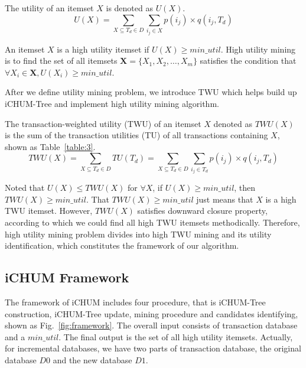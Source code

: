 \documentclass[runningheads,a4paper]{llncs}
\begin{document}
\begin{definition} %
The utility of an itemset $ X $ is denoted as $ U(X) $. 
\begin{equation}
U(X) = \sum_{X \subseteq T_{d} \in D} \sum_{i_{j} \in X} p(i_{j}) \times q(i_{j},T_{d})
\end{equation}
\end{definition}
\begin{definition} %
An itemset $ X $ is a high utility itemset if $ U(X) \ge min\_util $. High utility mining is to find the set of all itemsets $ \mathbf{X} = \{X_{1},X_{2},\ldots,X_{m}\} $ satisfies the condition that $ \forall X_{i} \in \mathbf{X}, U(X_{i}) \ge min\_util $. 
\end{definition}

After we define utility mining problem, we introduce TWU \cite{Liu:two-phasewithCCPD} which helps build up iCHUM-Tree and implement high utility mining algorithm.

\begin{definition} 
The transaction-weighted utility (TWU) of an itemset $ X $ denoted as $ TWU(X) $ is the sum of the transaction utilities (TU) of all transactions containing $ X $, shown as Table~\ref{table:3}.  
\begin{equation}
TWU(X) = \sum_{X \subseteq T_{d} \in D}TU(T_{d}) = \sum_{X \subseteq T_{d} \in D} \sum_{i_{j} \in T_{d}} p(i_{j}) \times q(i_{j},T_{d})
\end{equation}
\end{definition}

Noted that $ U(X) \le TWU(X) $ for $ \forall X $, if $ U(X) \ge min\_util $, then $ TWU(X) \ge min\_util $. That $ TWU(X) \ge min\_util $ just means that $ X $ is a high TWU itemset. However, $ TWU(X) $ satisfies downward closure property, according to which we could find all high TWU itemsets methodically. Therefore, high utility mining problem divides into high TWU mining and its utility identification, which constitutes the framework of our algorithm.

\subsection{iCHUM Framework}
The framework of iCHUM includes four procedure, that is iCHUM-Tree construction, iCHUM-Tree update, mining procedure and candidates identifying, shown as Fig.~\ref{fig:framework}. The overall input consists of transaction database and a $ min\_util $. The final output is the set of all high utility itemsets. Actually, for incremental databases, we have two parts of transaction database, the original database $ D0 $ and the new database $ D1 $. 
\end{document}
